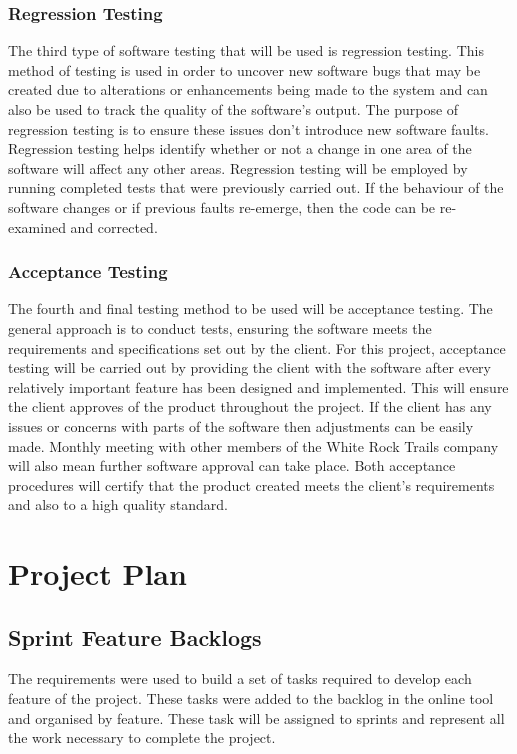 \documentclass[11pt,a4paper]{article}
\begin{document}
\subsubsection{Regression Testing}
The third type of software testing that will be used is regression testing. This method of testing is used in order to uncover new software bugs that may be created due to alterations or enhancements being made to the system and can also be used to track the quality of the software's output. The purpose of regression testing is to ensure these issues don't introduce new software faults. Regression testing helps identify whether or not a change in one area of the software will affect any other areas. Regression testing will be employed by running completed tests that were previously carried out. If the behaviour of the software changes or if previous faults re-emerge, then the code can be re-examined and corrected. 

\subsubsection{Acceptance Testing}
The fourth and final testing method to be used will be acceptance testing. The general approach is to conduct tests, ensuring the software meets the requirements and specifications set out by the client. For this project, acceptance testing will be carried out by providing the client with the software after every relatively important feature has been designed and implemented. This will ensure the client approves of the product throughout the project. If the client has any issues or concerns with parts of the software then adjustments can be easily made. Monthly meeting with other members of the White Rock Trails company will also mean further software approval can take place. Both acceptance procedures will certify that the product created meets the client's requirements and also to a high quality standard.

\section{Project Plan}
\label{sec:project-plan}

\subsection{Sprint Feature Backlogs}

The requirements were used to build a set of tasks required to develop each feature of the project. These tasks were added to the backlog in the online tool and organised by feature. These task will be assigned to sprints and represent all the work necessary to complete the project. 
\end{document}
